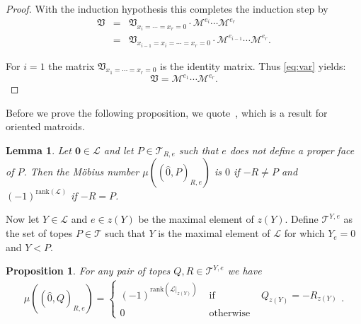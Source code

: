 \documentclass[12pt]{amsart}
\def\Var{{\mathfrak V}}
\def\Tscr{{\mathcal T}}
\def\rank{{\mathrm{rank}}}
\theoremstyle{plain}
\newtheorem{Lemma}{Lemma}
\numberwithin{Lemma}{\DefaultNumberTheoremWithin}
\numberwithin{Claim}{\DefaultNumberTheoremWithin}
\numberwithin{Theorem}{\DefaultNumberTheoremWithin}
\numberwithin{Corollary}{\DefaultNumberTheoremWithin}
\newtheorem{Proposition}{Proposition}
\numberwithin{Proposition}{\DefaultNumberTheoremWithin}
\numberwithin{Conjecture}{\DefaultNumberTheoremWithin}
\numberwithin{Situation}{\DefaultNumberTheoremWithin}
\numberwithin{Note}{\DefaultNumberTheoremWithin}
\theoremstyle{definition}
\numberwithin{Definition}{\DefaultNumberTheoremWithin}
\theoremstyle{definition}
\numberwithin{Question}{\DefaultNumberTheoremWithin}
\theoremstyle{definition}
\numberwithin{Problem}{\DefaultNumberTheoremWithin}
\theoremstyle{remark} \newtheorem{Remark}{Remark}
\numberwithin{Remark}{\DefaultNumberTheoremWithin}
\theoremstyle{remark}
\numberwithin{Example}{\DefaultNumberTheoremWithin}
\numberwithin{Case}{Lemma}
\numberwithin{Step}{Lemma}
\begin{document}
\begin{proof}
	  With the induction hypothesis this completes the induction step by
	  \begin{eqnarray*}
	     \Var & = & \Var_{x_i=\cdots = x_r = 0} \cdot \mathcal{M}^{e_i} \cdots \mathcal{M}^{e_r} \\
		  & = & \Var_{x_{i-1} = x_i=\cdots = x_r = 0} \cdot \mathcal{M}^{e_{i-1}} \cdots \mathcal{M}^{e_r}. 
	  \end{eqnarray*}

	  For $i =1$ the matrix $\Var_{x_1=\cdots = x_r = 0}$ is the identity matrix. 
	  Thus \eqref{eq:var} yields:
	  $$\Var = \mathcal{M}^{e_1} \cdots \mathcal{M}^{e_r}.$$
	\end{proof}
Before we prove the following proposition, we quote~\cite[Corollary 3]{WH}, which is a result for oriented matroids.

\begin{Lemma}\label{lem:moebius}
Let $\mathbf{0} \in \mathcal{L}$ and let $P \in \Tscr_{R,e}$ such that $e$ does not define a proper face of $P$.
  Then the M\"obius 
  number 
  $\mu((\hat{0},P)_{R,e})$ is $0$ if $-R \neq P$ and   
  $(-1)^{\rank(\mathcal{L})}$ if $-R = P$. 
\end{Lemma}

Now let $Y \in \mathcal{L}$ and $e \in z(Y)$ be the maximal element of
$z(Y)$. Define $\Tscr^{Y,e}$ as the set of topes $P \in \Tscr$
such that $Y$ is the maximal element of $\mathcal{L}$ for which $Y_e = 0$ and $Y < P$.
	 
\begin{Proposition}\label{pro:contraction}
  For any pair of topes  $Q,R \in \Tscr^{Y,e}$ we have 
  \begin{eqnarray*} 
     \mu((\hat{0},Q)_{R,e}) = 
       \left\{ \begin{array}{ccc} 
          (-1)^{\rank(\mathcal{L}|_{z(Y)})} & \mbox{~if~} & Q_{z(Y)} = -R_{z(Y)} \\ 
          0 & \mbox{~otherwise~} & 
  \end{array} \right. .  
  \end{eqnarray*} 
  
\end{Proposition}
\end{document}
